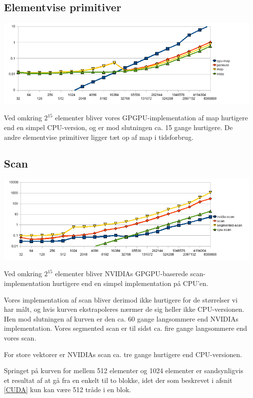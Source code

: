 \subsection{Elementvise primitiver}

\includegraphics[width=1.0\textwidth]{bench-map.png}

Ved omkring $2^{15}$ elementer bliver vores GPGPU-implementation af map hurtigere end en
simpel CPU-version, og er mod slutningen ca. 15 gange hurtigere. 
De andre elementvise primitiver ligger tæt op af map i tidsforbrug.

\subsection{Scan}

\includegraphics[width=1.0\textwidth]{bench-scan.png}

Ved omkring $2^{15}$ elementer bliver NVIDIAs GPGPU-baserede scan-implementation hurtigere 
end en simpel implementation på CPU'en.

Vores implementation af scan bliver derimod ikke hurtigere for de størrelser
vi har målt, og hvis kurven ekstrapoleres nærmer de sig heller ikke CPU-versionen. Hen mod 
slutningen af kurven er den ca. 60 gange langsommere end NVIDIAs implementation. 
Vores segmented scan er til sidst ca. fire gange langsommere end vores scan.

For store vektorer er NVIDIAs scan ca. tre gange hurtigere end CPU-versionen.

Springet på kurven for mellem 512 elementer og 1024 elementer er sandsynligvis et resultat 
af at gå fra en enkelt til to blokke, idet der som beskrevet i afsnit \ref{CUDA} kun 
kan være 512 tråde i en blok.

